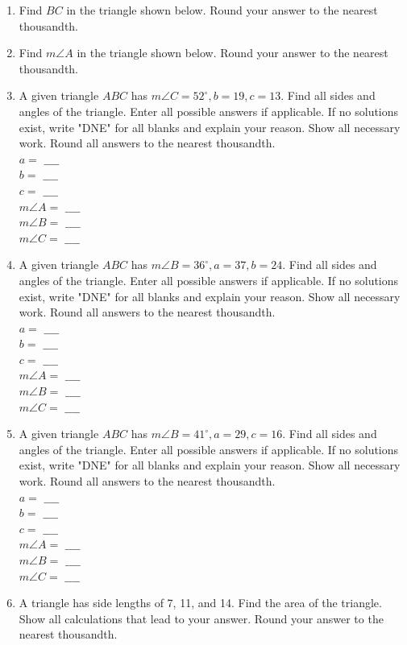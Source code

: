 \documentclass[10pt]{article}
\begin{document}
\begin{enumerate}
  \item Find $B C$ in the triangle shown below. Round your answer to the nearest thousandth.
  \item Find $m \angle A$ in the triangle shown below. Round your answer to the nearest thousandth.
  \item A given triangle $A B C$ has $m \angle C=52^{\circ}, b=19, c=13$. Find all sides and angles of the triangle. Enter all possible answers if applicable. If no solutions exist, write "DNE" for all blanks and explain your reason. Show all necessary work. Round all answers to the nearest thousandth.\\
$a=$ $\_\_\_\_$\\
$b=$ $\_\_\_\_$\\
$c=$ $\_\_\_\_$\\
$m \angle A=$ $\_\_\_\_$\\
$m \angle B=$ $\_\_\_\_$\\
$m \angle C=$ $\_\_\_\_$
  \item A given triangle $A B C$ has $m \angle B=36^{\circ}, a=37, b=24$. Find all sides and angles of the triangle. Enter all possible answers if applicable. If no solutions exist, write "DNE" for all blanks and explain your reason. Show all necessary work. Round all answers to the nearest thousandth.\\
$a=$ $\_\_\_\_$\\
$b=$ $\_\_\_\_$\\
$c=$ $\_\_\_\_$\\
$m \angle A=$ $\_\_\_\_$\\
$m \angle B=$ $\_\_\_\_$\\
$m \angle C=$ $\_\_\_\_$
  \item A given triangle $A B C$ has $m \angle B=41^{\circ}, a=29, c=16$. Find all sides and angles of the triangle. Enter all possible answers if applicable. If no solutions exist, write "DNE" for all blanks and explain your reason. Show all necessary work. Round all answers to the nearest thousandth.\\
$a=$ $\_\_\_\_$\\
$b=$ $\_\_\_\_$\\
$c=$ $\_\_\_\_$\\
$m \angle A=$ $\_\_\_\_$\\
$m \angle B=$ $\_\_\_\_$\\
$m \angle C=$ $\_\_\_\_$
  \item A triangle has side lengths of 7, 11, and 14. Find the area of the triangle. Show all calculations that lead to your answer. Round your answer to the nearest thousandth.
\end{enumerate}
\end{document}
